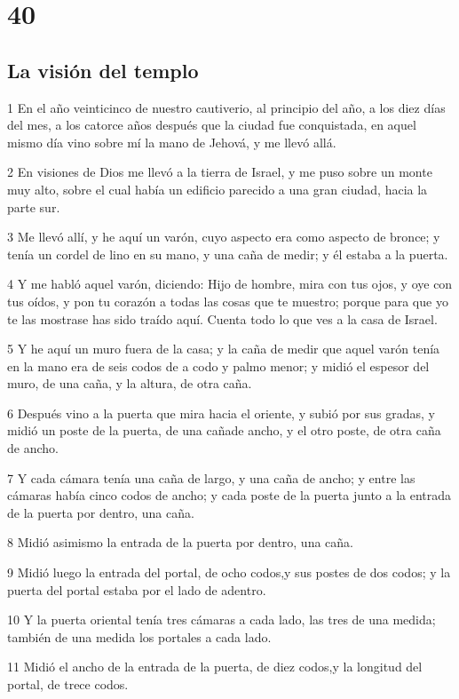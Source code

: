 \chapter{40}

\section*{La visión del templo}

\par 1 En el año veinticinco de nuestro cautiverio, al principio del año, a los diez días del mes, a los catorce años después que la ciudad fue conquistada, en aquel mismo día vino sobre mí la mano de Jehová, y me llevó allá.
\par 2 En visiones de Dios me llevó a la tierra de Israel, y me puso sobre un monte muy alto, sobre el cual había un edificio parecido a una gran ciudad, hacia la parte sur. 
\par 3 Me llevó allí, y he aquí un varón, cuyo aspecto era como aspecto de bronce; y tenía un cordel de lino en su mano, y una caña de medir; y él estaba a la puerta.
\par 4 Y me habló aquel varón, diciendo: Hijo de hombre, mira con tus ojos, y oye con tus oídos, y pon tu corazón a todas las cosas que te muestro; porque para que yo te las mostrase has sido traído aquí. Cuenta todo lo que ves a la casa de Israel.
\par 5 Y he aquí un muro fuera de la casa; y la caña de medir que aquel varón tenía en la mano era de seis codos de a codo y palmo menor; y midió el espesor del muro, de una caña, y la altura, de otra caña.
\par 6 Después vino a la puerta que mira hacia el oriente, y subió por sus gradas, y midió un poste de la puerta, de una cañade ancho, y el otro poste, de otra caña de ancho.
\par 7 Y cada cámara tenía una caña de largo, y una caña de ancho; y entre las cámaras había cinco codos de ancho; y cada poste de la puerta junto a la entrada de la puerta por dentro, una caña.
\par 8 Midió asimismo la entrada de la puerta por dentro, una caña.
\par 9 Midió luego la entrada del portal, de ocho codos,y sus postes de dos codos; y la puerta del portal estaba por el lado de adentro.
\par 10 Y la puerta oriental tenía tres cámaras a cada lado, las tres de una medida; también de una medida los portales a cada lado.
\par 11 Midió el ancho de la entrada de la puerta, de diez codos,y la longitud del portal, de trece codos.
